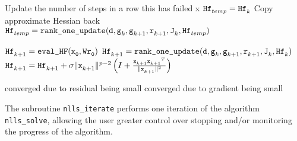 \begin{algorithm}
  \ContinuedFloat
  \begin{algorithmic}

          \Comment Update the number of steps in a row this has failed
            x
            \State ${\iter[temp]{\thess}} = {\iter[k]{\thess}}$
            \Comment Copy approximate Hessian back
          \EndIf
          \EndIf
        \EndIf
      \State ${\iter[temp]{\thess}} = \Call{{\tt rank\_one\_update}}{\td ,\iter[k]{\tg},\iter[k+1]{\tg}, \iter[k+1]{\tr},\iter[k]{\tJ},\iter[temp]{\thess}}$
      \EndIf
    \EndIf

        \State $\iter[k+1]{\thess} = {\tt \text{\tt eval\_HF}(\iter[0]{\tx},W\iter[0]{\tr})}$
      \Else
        \State ${\iter[k+1]{\thess}} = \Call{{\tt rank\_one\_update}}{\td ,\iter[k]{\tg},\iter[k+1]{\tg}, \iter[k+1]{\tr},\iter[k]{\tJ},\iter[k]{\thess}}$
      \EndIf
    \EndIf
    \State $\iter[k+1]{\thess}  = \iter[k+1]{\thess}  + \sigma \|\iter[k+1]{\tx}\|^{p-2}
    \left(I + \frac{{\iter[k+1]{\tx}}{\iter[k+1]{\tx}}^T}{\|\iter[k+1]{\tx}\|^2}\right)$
    \EndIf

    \Comment converged due to residual being small
    \Comment converged due to gradient being small
    \EndIf
    \EndFor
  \end{algorithmic}
\end{algorithm}

The subroutine \texttt{nlls\_iterate} performs one iteration of the algorithm
\texttt{nlls\_solve}, allowing the user greater control over stopping and/or monitoring the progress of the algorithm.

